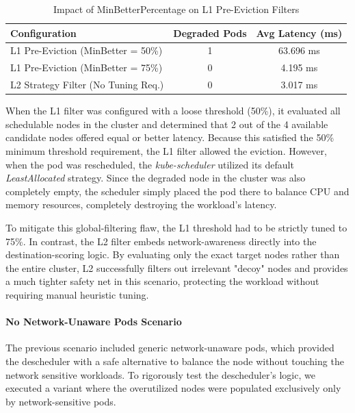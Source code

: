 \begin{table}[tbp]
    \centering
    \begin{tabular}{@{}l c c@{}}
        \toprule
        \textbf{Configuration} & \textbf{Degraded Pods} & \textbf{Avg Latency (ms)} \\
        \midrule
        L1 Pre-Eviction (MinBetter = 50\%) & 1 & 63.696 ms \\
        L1 Pre-Eviction (MinBetter = 75\%) & 0 & 4.195 ms\\
        \midrule
        L2 Strategy Filter (No Tuning Req.) & 0 & 3.017 ms\\
        \bottomrule
    \end{tabular}
    \caption{Impact of MinBetterPercentage on L1 Pre-Eviction Filters}
    \label{tab:minbetter_impact}
\end{table}

When the L1 filter was configured with a loose threshold (50\%), it evaluated all schedulable nodes in the cluster and determined that 2 out of the 4 available candidate nodes offered equal or better latency. Because this satisfied the 50\% minimum threshold requirement, the L1 filter allowed the eviction. However, when the pod was rescheduled, the \textit{kube-scheduler} utilized its default \textit{LeastAllocated} strategy. Since the degraded node in the cluster was also completely empty, the scheduler simply placed the pod there to balance CPU and memory resources, completely destroying the workload's latency.

To mitigate this global-filtering flaw, the L1 threshold had to be strictly tuned to 75\%. In contrast, the L2 filter embeds network-awareness directly into the destination-scoring logic. By evaluating only the exact target nodes rather than the entire cluster, L2 successfully filters out irrelevant "decoy" nodes and provides a much tighter safety net in this scenario, protecting the workload without requiring manual heuristic tuning.

\paragraph{No Network-Unaware Pods Scenario}
\label{sec:no_filler_pods}
The previous scenario included generic network-unaware pods, which provided the descheduler with a safe alternative to balance the node without touching the network sensitive workloads. To rigorously test the descheduler's logic, we executed a variant where the overutilized nodes were populated exclusively only by network-sensitive pods.

